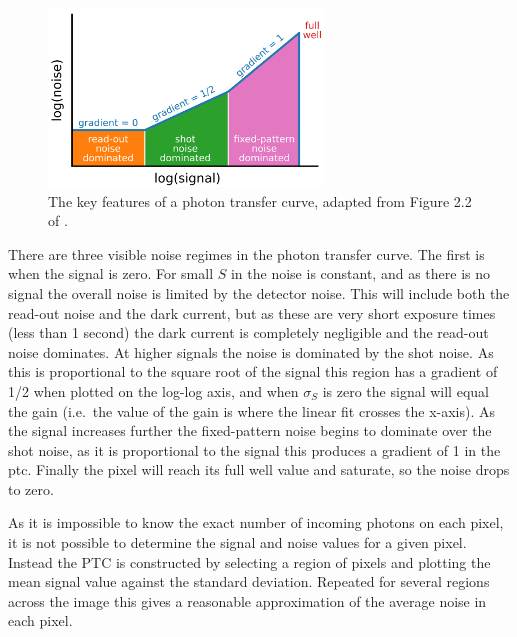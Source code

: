 \begin{colsection}
\begin{colsection}
\begin{figure}[t]
    \begin{center}
        \includegraphics[width=0.65\textwidth]{images/ptc.pdf}
    \end{center}
    \caption[Key features of the photon transfer curve]{
        The key features of a photon transfer curve, adapted from Figure 2.2 of \citet{CCDs}.
    }\label{fig:ptc_cartoon}
\end{figure}

There are three visible noise regimes in the photon transfer curve. The first is when the signal is zero. For small $S$ in  the noise is constant, and as there is no signal the overall noise is limited by the detector noise. This will include both the read-out noise and the dark current, but as these are very short exposure times (less than 1 second) the dark current is completely negligible and the read-out noise dominates. At higher signals the noise is dominated by the shot noise. As this is proportional to the square root of the signal this region has a gradient of 1/2 when plotted on the log-log axis, and when $\sigma_S$ is zero the signal will equal the gain (i.e.\ the value of the gain is where the linear fit crosses the x-axis). As the signal increases further the fixed-pattern noise begins to dominate over the shot noise, as it is proportional to the signal this produces a gradient of 1 in the \gls{ptc}. Finally the pixel will reach its full well value and saturate, so the noise drops to zero.

As it is impossible to know the exact number of incoming photons on each pixel, it is not possible to determine the signal and noise values for a given pixel. Instead the PTC is constructed by selecting a region of pixels and plotting the mean signal value against the standard deviation. Repeated for several regions across the image this gives a reasonable approximation of the average noise in each pixel.

\newpage


\end{colsection}
\end{colsection}
